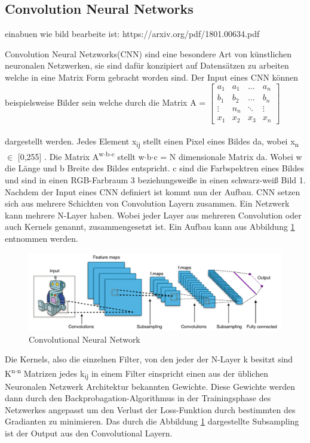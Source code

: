 \documentclass{llncs}
\begin{document}
\subsection{Convolution Neural Networks}

einabuen wie bild bearbeite ist:
https://arxiv.org/pdf/1801.00634.pdf

Convolution Neural Netzworks(CNN) sind eine besondere Art von künstlichen neuronalen Netzwerken, sie sind dafür konzipiert auf Datensätzen zu arbeiten welche in eine Matrix Form gebracht worden sind. Der Input eines CNN können beispielsweise Bilder sein welche durch die Matrix A =
$
\begin{bmatrix}
a_1	& a_1	& \dots	 & a_n     \\
b_1	& b_2 	& \dots  & b_n	  \\
\vdots	& n_n 	& \ddots & \vdots \\
x_1 	& x_2 & x_3	 & x_n
\end{bmatrix}
$
\\\\dargestellt werden. Jedes Element x\textsubscript{ij} stellt einen Pixel eines Bildes da, wobei x\textsubscript{n} $\in$ [0,255] . Die Matrix A\textsuperscript{w$\cdot$b$\cdot$c} stellt w$\cdot$b$\cdot$c = N dimensionale Matrix da. Wobei w die Länge und b Breite des Bildes entspricht. c sind die Farbspektren eines Bildes und sind in einen RGB-Farbraum 3 beziehungsweiße in einen schwarz-weiß Bild 1. Nachdem  der Input eines CNN definiert ist kommt nun der Aufbau. CNN setzen sich aus mehrere Schichten von Convolution Layern zusammen. Ein Netzwerk kann mehrere N-Layer haben. Wobei jeder Layer aus mehreren Convolution oder auch Kernels genannt, zusammengesetzt ist. Ein Aufbau kann aus Abbildung \ref{fig:Bild2} entnommen werden\cite{Grundlagen}.

\begin{figure}[htbp] 
	\centering
	\includegraphics[width=1.0\textwidth]{convol.png}
	\caption{Convolutional Neural Network}
	\label{fig:Bild2}
\end{figure}

Die Kernels, also die einzelnen Filter, von den jeder der N-Layer k besitzt sind K\textsuperscript{n$\cdot$n} Matrizen jedes k\textsubscript{ij} in einem Filter einspricht einen aus der üblichen Neuronalen Netzwerk Architektur bekannten Gewichte. Diese Gewichte werden dann durch den Backprobagation-Algorithmus in der Trainingsphase des Netzwerkes angepasst um den Verlust der Loss-Funktion durch bestimmten des Gradianten zu minimieren. Das durch die Abbildung \ref{fig:Bild2} dargestellte Subsampling ist der Output aus den Convolutional Layern\cite{Grundlagen}. 
\end{document}
